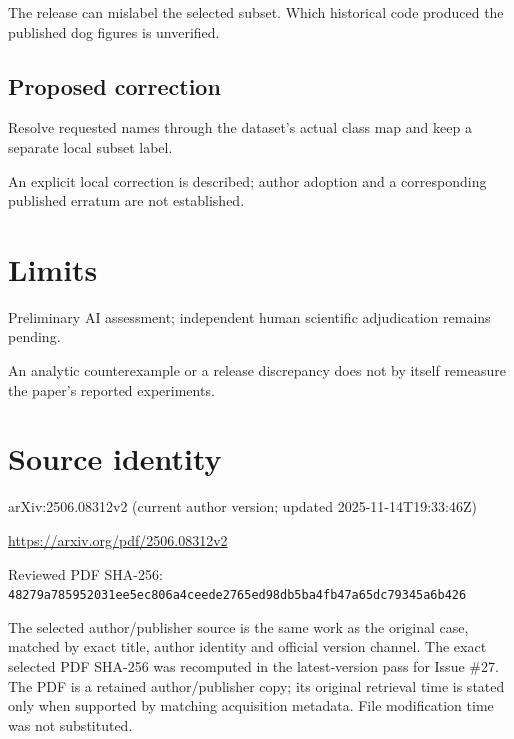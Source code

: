 \documentclass[11pt]{article}
\begin{document}
The release can mislabel the selected subset. Which historical code produced the published dog figures is unverified.

\subsection*{Proposed correction}

Resolve requested names through the dataset’s actual class map and keep a separate local subset label.

An explicit local correction is described; author adoption and a corresponding published erratum are not established.

\section*{Limits}

Preliminary AI assessment; independent human scientific adjudication remains pending.\par

An analytic counterexample or a release discrepancy does not by itself remeasure the paper’s reported experiments.\par

\section*{Source identity}

arXiv:2506.08312v2 (current author version; updated 2025-11-14T19:33:46Z)

\url{https://arxiv.org/pdf/2506.08312v2}

Reviewed PDF SHA-256: \nolinkurl{48279a785952031ee5ec806a4ceede2765ed98db5ba4fb47a65dc79345a6b426}

The selected author/publisher source is the same work as the original case, matched by exact title, author identity and official version channel. The exact selected PDF SHA-256 was recomputed in the latest-version pass for Issue \#27. The PDF is a retained author/publisher copy; its original retrieval time is stated only when supported by matching acquisition metadata. File modification time was not substituted.
\end{document}
